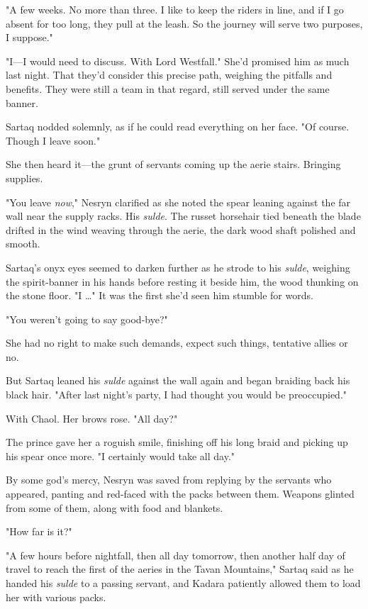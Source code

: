 "A few weeks. No more than three. I like to keep the riders in line, and if I go absent for too long, they pull at the leash. So the journey will serve two purposes, I suppose."

"I---I would need to discuss. With Lord Westfall." She'd promised him as much last night. That they'd consider this precise path, weighing the pitfalls and benefits. They were still a team in that regard, still served under the same banner.

Sartaq nodded solemnly, as if he could read everything on her face. "Of course. Though I leave soon."

She then heard it---the grunt of servants coming up the aerie stairs. Bringing supplies.

"You leave \emph{now}," Nesryn clarified as she noted the spear leaning against the far wall near the supply racks. His \emph{sulde}. The russet horsehair tied beneath the blade drifted in the wind weaving through the aerie, the dark wood shaft polished and smooth.

Sartaq's onyx eyes seemed to darken further as he strode to his
\emph{sulde}, weighing the spirit-banner in his hands before resting it beside him, the wood thunking on the stone floor. "I \ldots" It was the first she'd seen him stumble for words.

"You weren't going to say good-bye?"

She had no right to make such demands, expect such things, tentative allies or no.

But Sartaq leaned his \emph{sulde} against the wall again and began braiding back his black hair. "After last night's party, I had thought you would be  preoccupied."

With Chaol. Her brows rose. "All day?"

The prince gave her a roguish smile, finishing off his long braid and picking up his spear once more. "I certainly would take all day."

By some god's mercy, Nesryn was saved from replying by the servants who appeared, panting and red-faced with the packs between them. Weapons glinted from some of them, along with food and blankets.

"How far is it?"

"A few hours before nightfall, then all day tomorrow, then another half day of travel to reach the first of the aeries in the Tavan Mountains," Sartaq said as he handed his \emph{sulde} to a passing servant, and Kadara patiently allowed them to load her with various packs.

